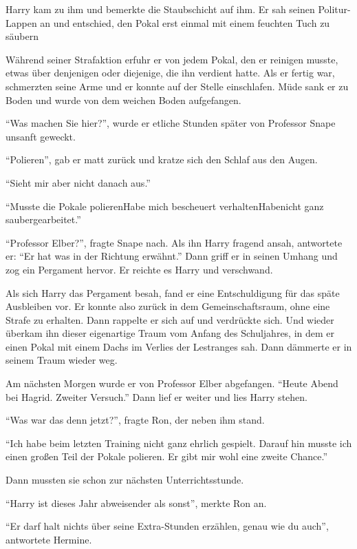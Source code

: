 Harry kam zu ihm und bemerkte die Staubschicht auf ihm. Er sah seinen Politur-Lappen an und entschied, den Pokal erst einmal mit einem feuchten Tuch zu säubern\abs

Während seiner Strafaktion erfuhr er von jedem Pokal, den er reinigen musste, etwas über denjenigen oder diejenige, die ihn verdient hatte. Als er fertig war, schmerzten seine Arme und er konnte auf der Stelle einschlafen. Müde sank er zu Boden und wurde von dem weichen Boden aufgefangen.

\enquote{Was machen Sie hier?}, wurde er etliche Stunden später von Professor Snape unsanft geweckt.

\enquote{Polieren}, gab er matt zurück und kratze sich den Schlaf aus den Augen.

\enquote{Sieht mir aber nicht danach aus.}

\enquote{Musste die Pokale polieren\abs Habe mich bescheuert verhalten\abs Habe\abs nicht ganz sauber\abs gearbeitet.}

\enquote{Professor Elber?}, fragte Snape nach. Als ihn Harry fragend ansah, antwortete er: \enquote{Er hat was in der Richtung erwähnt.} Dann griff er in seinen Umhang und zog ein Pergament hervor. Er reichte es Harry und verschwand.

Als sich Harry das Pergament besah, fand er eine Entschuldigung für das späte Ausbleiben vor. Er konnte also zurück in dem Gemeinschaftsraum, ohne eine Strafe zu erhalten. Dann rappelte er sich auf und verdrückte sich. Und wieder überkam ihn dieser eigenartige Traum vom Anfang des Schuljahres, in dem er einen Pokal mit einem Dachs im Verlies der Lestranges sah. Dann dämmerte er in seinem Traum wieder weg.

Am nächsten Morgen wurde er von Professor Elber abgefangen. \enquote{Heute Abend bei Hagrid. Zweiter Versuch.} Dann lief er weiter und lies Harry stehen.

\enquote{Was war das denn jetzt?}, fragte Ron, der neben ihm stand.

\enquote{Ich habe beim letzten Training nicht ganz ehrlich gespielt. Darauf hin musste ich einen großen Teil der Pokale polieren. Er gibt mir wohl eine zweite Chance.}

Dann mussten sie schon zur nächsten Unterrichtsstunde.

\enquote{Harry ist dieses Jahr abweisender als sonst}, merkte Ron an.

\enquote{Er darf halt nichts über seine Extra-Stunden erzählen, genau wie du auch}, antwortete Hermine.

